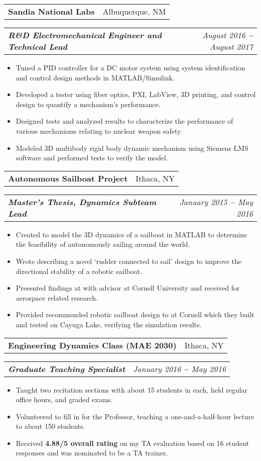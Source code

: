\documentclass[letterpaper,11pt]{article}
\makeatletter
\newcommand{\resumeItem}[1]{
  \item\small{
    {#1}
  }
}
\newcommand{\resumeSubheading}[2]{
  \item 
    \begin{tabular*}{1\textwidth}[b]{l@{\extracolsep{\fill}}r}
      \textbf{#1} & #2
    \end{tabular*}
}
\newcommand{\resumeSubSubheading}[2]{
    \item
    \begin{tabular*}{1.0\textwidth}[b]{l@{\extracolsep{\fill}}r}
      \textit{\textbf{\small#1}} & \textit{\small #2}
    \end{tabular*}
}
\newcommand{\resumeItemListStart}{\begin{itemize}[leftmargin=15pt]}
\newcommand{\resumeItemListEnd}{\end{itemize}}
\newcommand{\bref}[2]{\href{#1}{\color{blue}{#2}}}
\makeatother
\begin{document}
\resumeSubheading
{Sandia National Labs}{Albuquerque, NM}
\resumeSubSubheading
{R\&D Electromechanical Engineer and Technical Lead}{August 2016 \textbf{--} August 2017}
\resumeItemListStart
\resumeItem{Tuned a PID controller for a DC motor system using system identification and control design methods in MATLAB/Simulink.}
\resumeItem{Developed a tester using fiber optics, PXI, LabView, 3D printing, and control design to quantify a mechanism’s performance.}
\resumeItem{Designed tests and analyzed results to characterize the performance of various mechanisms relating to nuclear weapon safety.}
\resumeItem{Modeled 3D multibody rigid body dynamic mechanism using Siemens LMS software and performed tests to verify the model.}
\resumeItemListEnd

\resumeSubheading
{Autonomous Sailboat Project}{Ithaca, NY}
\resumeSubSubheading
{Master’s Thesis, Dynamics Subteam Lead}{January 2015 \textbf{--} May 2016}
\resumeItemListStart
\resumeItem{Created \bref{https://github.com/jam643/SailboatSim3D/tree/master}{a simulation framework} to model the 3D dynamics of a sailboat in MATLAB to determine the feasibility of autonomously sailing around the world.}
\resumeItem{Wrote \bref{https://bpb-us-w2.wpmucdn.com/sites.coecis.cornell.edu/dist/5/91/files/2017/06/Semester-Report-Spring-2016-Jesse-Miller-1e485cb.pdf}{a thesis paper} describing a novel ‘rudder connected to sail’ design to improve the directional stability of a robotic sailboat.}
\resumeItem{Presented findings at \bref{https://robotics.cornell.edu/2019/08/14/a-directionally-self-stable-robotic-sail-boat-concept-and-simulations/}{a robotics seminar} with advisor \bref{http://ruina.tam.cornell.edu/}{Andy Ruina} at Cornell University and received \bref{https://www.mae.cornell.edu/news/sibley-school-mechanical-aerospace-engineering-student-awards-0}{the Kelly Prize} for aerospace related research.}
\resumeItem{Provided recommended robotic sailboat design to \bref{https://cusail.com/}{CUSail project team} at Cornell which they built and tested on Cayuga Lake, verifying the simulation results.}
\resumeItemListEnd

\resumeSubheading
{Engineering Dynamics Class (MAE 2030)}{Ithaca, NY}
\resumeSubSubheading
{Graduate Teaching Specialist}{January 2016 \textbf{--} May 2016}
\resumeItemListStart
\resumeItem{Taught two recitation sections with about 15 students in each, held regular office hours, and graded exams.}
\resumeItem{Volunteered to fill in for the Professor, teaching a one-and-a-half-hour lecture to about 150 students.}
\resumeItem{Received \textbf{4.88/5 overall rating} on my TA evaluation based on 16 student responses and was nominated to be a TA trainer.}
\resumeItemListEnd
\end{document}
